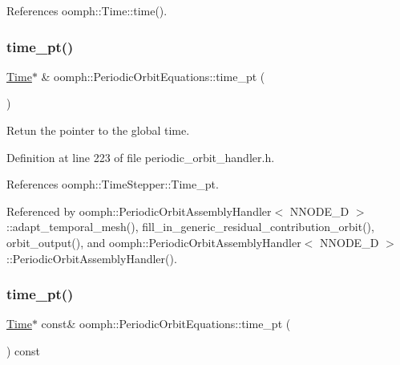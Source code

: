 References oomph\+::\+Time\+::time().

\mbox{\label{classoomph_1_1PeriodicOrbitEquations_a2886a97c72b03dfd68aeb9f8a5490b4f}} 
\subsubsection{\texorpdfstring{time\+\_\+pt()}{time\_pt()}\hspace{0.1cm}{\footnotesize\ttfamily [1/2]}}
{\footnotesize\ttfamily \hyperlink{classoomph_1_1Time}{Time}$\ast$ \& oomph\+::\+Periodic\+Orbit\+Equations\+::time\+\_\+pt (\begin{DoxyParamCaption}{ }\end{DoxyParamCaption})\hspace{0.3cm}{\ttfamily [inline]}}



Retun the pointer to the global time. 



Definition at line 223 of file periodic\+\_\+orbit\+\_\+handler.\+h.



References oomph\+::\+Time\+Stepper\+::\+Time\+\_\+pt.



Referenced by oomph\+::\+Periodic\+Orbit\+Assembly\+Handler$<$ N\+N\+O\+D\+E\+\_\+D $>$\+::adapt\+\_\+temporal\+\_\+mesh(), fill\+\_\+in\+\_\+generic\+\_\+residual\+\_\+contribution\+\_\+orbit(), orbit\+\_\+output(), and oomph\+::\+Periodic\+Orbit\+Assembly\+Handler$<$ N\+N\+O\+D\+E\+\_\+D $>$\+::\+Periodic\+Orbit\+Assembly\+Handler().

\mbox{\label{classoomph_1_1PeriodicOrbitEquations_aad73f9555bbb811d2bdaa6b659048e93}} 
\subsubsection{\texorpdfstring{time\+\_\+pt()}{time\_pt()}\hspace{0.1cm}{\footnotesize\ttfamily [2/2]}}
{\footnotesize\ttfamily \hyperlink{classoomph_1_1Time}{Time}$\ast$ const\& oomph\+::\+Periodic\+Orbit\+Equations\+::time\+\_\+pt (\begin{DoxyParamCaption}{ }\end{DoxyParamCaption}) const\hspace{0.3cm}{\ttfamily [inline]}}



